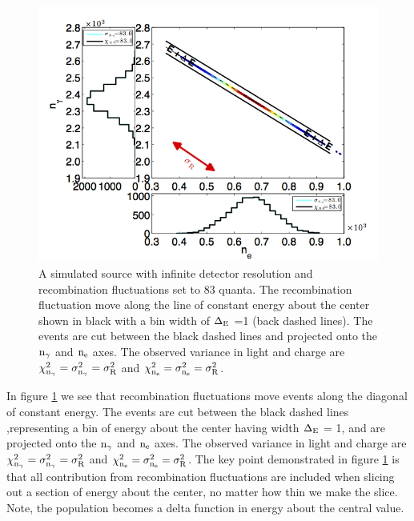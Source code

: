 \renewcommand{\baselinestretch}{1}
\small\normalsize
 \begin{figure}[h!]\centering
\includegraphics[width=160mm]{Chapter_Flucs/Figures/Ex_Plots/EX_R_Kr_.png}
\caption{A simulated \KrCal source with infinite detector resolution and recombination fluctuations set to 83 quanta. The recombination fluctuation move along the line of constant energy about the center shown in black with a bin width of $\rm \Delta_E$ =1 (back dashed lines). The events are cut between the black dashed lines and projected onto the $\rm n_\gamma$ and $\rm n_e$ axes. The observed variance in light and charge are $\rm \chi_{n_{\gamma}}^2 = \sigma_{n_{\gamma}}^2 = \sigma_{R}^2$ and $\rm \chi_{n_{e}}^2 = \sigma_{n_{e}}^2 = \sigma_{R}^2$.  }
\label{fig:Kr_ex_R}
\end{figure}
\renewcommand{\baselinestretch}{2}
\small\normalsize

\noindent In figure \ref{fig:Kr_ex_R} we see that recombination fluctuations move events along the diagonal of constant energy. The events are cut between the black dashed lines ,representing a bin of energy about the center having width $\rm \Delta_E$ = 1, and are projected onto the $\rm n_\gamma$ and $\rm n_e$ axes. The observed variance in light and charge are $\rm \chi_{n_{\gamma}}^2 = \sigma_{n_{\gamma}}^2 = \sigma_{R}^2$ and $\rm \chi_{n_{e}}^2 = \sigma_{n_{e}}^2 = \sigma_{R}^2$. The key point demonstrated in figure \ref{fig:Kr_ex_R} is that all contribution from recombination fluctuations are included when slicing out a section of energy about the center, no matter how thin we make the slice. Note, the population becomes a delta function in energy about the central value.

